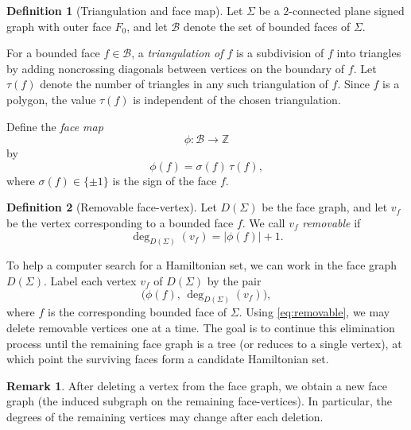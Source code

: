 \documentclass[12pt]{amsart}
\theoremstyle{theorem}%
\theoremstyle{definition}%
\newtheorem{remark}{Remark}%
\newtheorem{definition}{Definition}
\begin{document}
\begin{definition}[Triangulation and face map]
Let $\Sigma$ be a $2$-connected plane signed graph with outer face $F_0$, and let
$\mathcal{B}$ denote the set of bounded faces of $\Sigma$.

For a bounded face $f\in\mathcal{B}$, a \emph{triangulation of $f$}
is a subdivision of $f$ into triangles by adding noncrossing diagonals
between vertices on the boundary of $f$.
Let $\tau(f)$ denote the number of triangles in any such triangulation of $f$.
Since $f$ is a polygon, the value $\tau(f)$ is independent of the chosen triangulation.

Define the \emph{face map}
\[
\phi:\mathcal{B}\to \mathbb{Z}
\]
by
\[
\phi(f)=\sigma(f)\,\tau(f),
\]
where $\sigma(f)\in\{\pm1\}$ is the sign of the face $f$.
\end{definition}

\begin{definition}[Removable face-vertex]
Let $D(\Sigma)$ be the face graph, and let $v_f$ be the vertex corresponding to a bounded face $f$.
We call $v_f$ \emph{removable} if
\begin{equation}\label{eq:removable}
\deg_{D(\Sigma)}(v_f)=|\phi(f)|+1.
\end{equation}
\end{definition}

To help a computer search for a Hamiltonian set, we can work in the face graph $D(\Sigma)$.
Label each vertex $v_f$ of $D(\Sigma)$ by the pair
\[
\bigl(\phi(f),\,\deg_{D(\Sigma)}(v_f)\bigr),
\]
where $f$ is the corresponding bounded face of $\Sigma$.
Using \eqref{eq:removable}, we may delete removable vertices one at a time.
The goal is to continue this elimination process until the remaining face graph is a tree (or reduces to a
single vertex), at which point the surviving faces form a candidate Hamiltonian set.

\begin{remark}
After deleting a vertex from the face graph, we obtain a new face graph (the induced subgraph on the remaining
face-vertices). In particular, the degrees of the remaining vertices may change after each deletion.
\end{remark}
\end{document}
